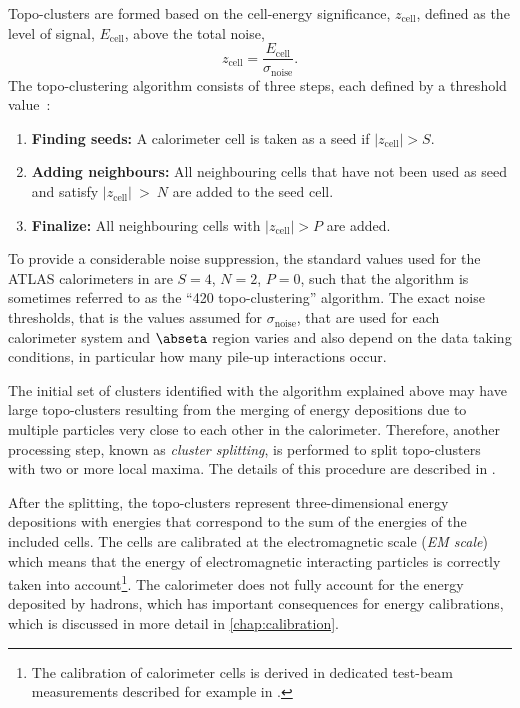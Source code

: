 Topo-clusters are formed based on the cell-energy significance, $z_{\text{cell}}$, defined as the level of signal, $E_{\text{cell}}$, above the total noise,
\begin{equation}
    z_{\text{cell}} = \frac{E_{\text{cell}}}{\sigma_{\text{noise}}}.
\end{equation}
The topo-clustering algorithm consists of three steps, each defined by a threshold value~\cite{PERF-2014-07}:
\begin{enumerate}
    \item \textbf{Finding seeds:} A calorimeter cell is taken as a seed if $|z_{\text{cell}}| > S$.
    \item \textbf{Adding neighbours:} All neighbouring cells that have not been used as seed and satisfy $|z_{\text{cell}}|~>~N$ are added to the seed cell.
    \item \textbf{Finalize: } All neighbouring cells with $|z_{\text{cell}}| > P$ are added.
\end{enumerate}
To provide a considerable noise suppression, the standard values used for the ATLAS calorimeters in \RunTwo are $S = 4$, $N = 2$, $P = 0$, such that the algorithm is sometimes referred to as the ``420 topo-clustering'' algorithm. The exact noise thresholds, that is the values assumed for $\sigma_{\text{noise}}$, that are used for each calorimeter system and $\abseta$ region varies and also depend on the data taking conditions, in particular how many pile-up interactions occur. 

The initial set of clusters identified with the algorithm explained above may have large topo-clusters resulting from the merging of energy depositions due to multiple particles very close to each other in the calorimeter.
Therefore, another processing step, known as \emph{cluster splitting}, is performed to split topo-clusters with two or more local maxima. The details of this procedure are described in .

After the splitting, the topo-clusters represent three-dimensional energy depositions with energies that correspond to the sum of the energies of the included cells.
The cells are calibrated at the electromagnetic scale (\emph{EM scale}) which means that the energy of electromagnetic interacting particles is correctly taken into account\footnote{The calibration of calorimeter cells is derived in dedicated test-beam measurements described for example in .}. The calorimeter does not fully account for the energy deposited by hadrons, which has important consequences for energy calibrations, which is discussed in more detail in \cref{chap:calibration}.

